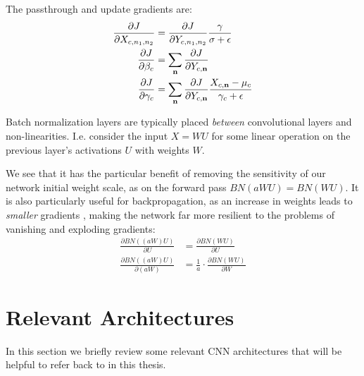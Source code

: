The passthrough and update gradients are:
\begin{align}
  \frac{\partial J}{\partial X_{c, n_1, n_2}} &= \frac{\partial J}{\partial Y_{c, n_1, n_2}}\frac{\gamma}{\sigma + \epsilon}\\
  \frac{\partial J}{\partial \beta_c} &=  \sum_{\mathbf{n}} \frac{\partial J}{\partial Y_{c, \mathbf{n}}}\\
  \frac{\partial J}{\partial \gamma_c} &= \sum_{\mathbf{n}} \frac{\partial J}{\partial Y_{c, \mathbf{n}}}\frac{X_{c, \mathbf{n}} - \mu_c}{\gamma_c + \epsilon}
\end{align}

Batch normalization layers are typically placed \emph{between} convolutional layers
and non-linearities. I.e. consider the input $X=WU$ for some linear operation
on the previous layer's activations $U$ with weights $W$.

We see that it has the particular benefit of removing
the sensitivity of our network initial weight scale, as on the forward pass
$BN(aWU) = BN(WU)$.  
It is also particularly useful for backpropagation, as an increase in
weights leads to \emph{smaller} gradients \cite{ioffe_batch_2015}, making
the network far more resilient to the problems of vanishing and exploding
gradients:
\begin{align}
  \frac{\partial BN((aW)U)}{\partial U} & =  \frac{\partial
  BN(WU)}{\partial U} \nonumber\\
  \frac{\partial BN((aW)U)}{\partial (aW)} & =  \frac{1}{a} \cdot \frac{\partial
  BN(WU)}{\partial W} 
\end{align}

\section{Relevant Architectures}
In this section we briefly review some relevant CNN architectures that will be
helpful to refer back to in this thesis. 

